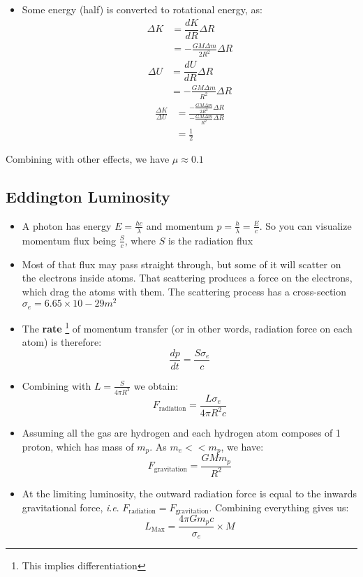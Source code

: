 \documentclass{article}
\newcommand{\ie}{\textit{i}.\textit{e}. }
\begin{document}
\begin{itemize}
\begin{itemize}
\begin{itemize}
\item Some energy (half) is converted to rotational energy, as:
\begin{align}
\Delta K& =\dfrac{dK}{dR} \Delta R\\
&=-\frac{GM\Delta m}{2R^2} \Delta R
\end{align}
\begin{align}
\Delta U& =\dfrac{dU}{dR} \Delta R\\
&=-\frac{GM\Delta m}{R^2} \Delta R
\end{align}
\begin{align}
\frac{\Delta K}{\Delta U}&=\frac{-\frac{GM\Delta m}{2R^2} \Delta R}{-\frac{GM\Delta m}{R^2} \Delta R}\\
&=\frac{1}{2}
\end{align}
\end{itemize}
\end{itemize}
Combining with other effects, we have $\mu \approx 0.1$
\end{itemize}
\subsection{Eddington Luminosity}
\begin{itemize}
    \item A photon has energy $E=\frac{hc}{\lambda}$ and momentum $p=\frac{h}{\lambda}=\frac{E}{c}$. So you can visualize momentum flux being $\frac{S}{c}$, where $S$ is the radiation flux
    \item Most of that flux may pass straight through, but some of it will scatter on the electrons inside atoms. That scattering produces a force on the electrons, which drag the
     atoms with them. The scattering process has a cross-section $\sigma_e = 6.65 × 10−29 m^2$ 
    \item The \textbf{rate} \footnote{This implies differentiation} of momentum transfer (or in other words, radiation force on each atom) is therefore:
     \begin{equation}
        \dfrac{dp}{dt}=\frac{S \sigma_e}{c}
     \end{equation}
    \item Combining with $L=\frac{S}{4 \pi R^2}$ we obtain:
    \begin{equation}
        F_\text{radiation}=\frac{L \sigma_e}{4 \pi R^2 c}
    \end{equation}
    \item Assuming all the gas are hydrogen and each hydrogen atom composes of 1 proton, which has mass of $m_p$. As $m_e<<m_p$, we have:
    \begin{equation}
        F_\text{gravitation}=\frac{GMm_p}{R^2}
    \end{equation}
    \item At the limiting luminosity, the outward radiation force is equal to the inwards gravitational force, \ie $F_\text{radiation}=F_\text{gravitation}$. Combining everything gives us:
    \begin{equation}
        L_\text{Max}=\frac{4 \pi G m_p c}{\sigma_e} \times M
    \end{equation}
\end{itemize}
\end{document}
